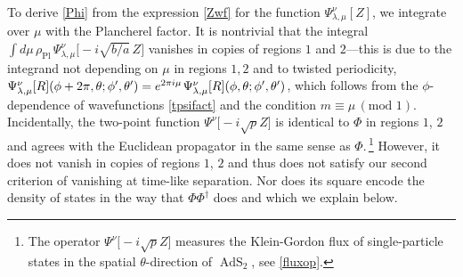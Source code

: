 \documentclass[12pt]{article}
\DeclareMathOperator{\tAdS}{\widetilde{AdS}}
\newcommand{\rPl}{\rho_{\text{Pl}}}
\newcommand{\tht}{\theta}
\newcommand{\lam}{\lambda}
\def\widetilde#1{#1}%
\begin{document}
To derive \eqref{Phi} from the expression \eqref{Zwf} for the function $\Psi^{\nu}_{\lam,\mu}[Z]$, we integrate over $\mu$ with the Plancherel factor. It is nontrivial that the integral $\int d\mu\,\rPl\,\Psi^{\nu}_{\lambda,\mu}\bigl[-i \sqrt{b/a}\,Z\bigr]$ vanishes in copies of regions $1$ and $2$---this is due to the integrand not depending on $\mu$ in regions $1,2$ and to twisted periodicity, $\Psi^{\nu}_{\lambda,\mu}[R](\phi+2\pi,\theta;\phi',\theta') =e^{2\pi i\mu}\kern1pt \Psi^{\nu}_{\lambda,\mu}[R](\phi,\theta;\phi',\theta')$, which follows from the $\phi$-dependence of wavefunctions \eqref{tpsifact} and the condition $m \equiv \mu\,(\text{mod }1)$. Incidentally, the two-point function $\Psi^{\nu}\bigl[-i \sqrt{p}Z\bigr]$ is identical to $\Phi$ in regions $1$, $2$ and  agrees with the Euclidean propagator in the same sense as $\Phi$.\,\footnote{The operator $\Psi^{\nu}\bigl[-i \sqrt{p}Z\bigr]$ measures the Klein-Gordon flux of single-particle states in the spatial $\tht$-direction of $\tAdS_2$, see \eqref{fluxop}.} However, it does not vanish in copies of regions $1$, $2$ and thus does not satisfy our second criterion of vanishing at time-like separation. Nor does its square encode the density of states in the way that $\Phi \Phi^{\dagger}$ does and which we explain below.
\end{document}
